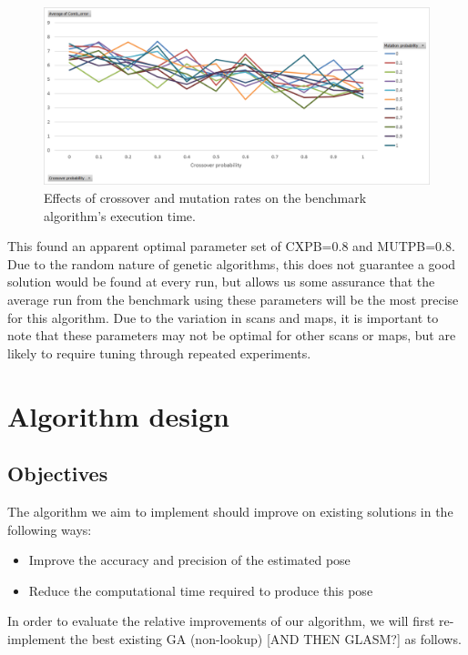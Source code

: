 \documentclass[authoryearcitations]{UoYCSproject}
\begin{document}
\begin{figure}[]
\centering
	\includegraphics[width=12cm,keepaspectratio]{images/ga_cxpb_mutpb.png}
	\caption[Optimising cross and mutation rate for benchmark algorithm.]{Effects of crossover and mutation rates on the benchmark algorithm's execution time.}
	\label{fig:ga_cxpb_mutpb}
\end{figure}

 This found an apparent optimal parameter set of CXPB=0.8 and MUTPB=0.8. Due to the random nature of genetic algorithms, this does not guarantee a good solution would be found at every run, but allows us some assurance that the average run from the benchmark using these parameters will be the most precise for this algorithm. Due to the variation in scans and maps, it is important to note that these parameters may not be optimal for other scans or maps, but are likely to require tuning through repeated experiments. 


\chapter{Algorithm design}
\section{Objectives}
\label{sec:objectives}
The algorithm we aim to implement should improve on existing solutions in the following ways:
\begin{itemize}
	\item Improve the accuracy and precision of the estimated pose
	\item Reduce the computational time required to produce this pose
\end{itemize}
In order to evaluate the relative improvements of our algorithm, we will first re-implement the best existing GA (non-lookup) [AND THEN GLASM?] as follows.
\end{document}

